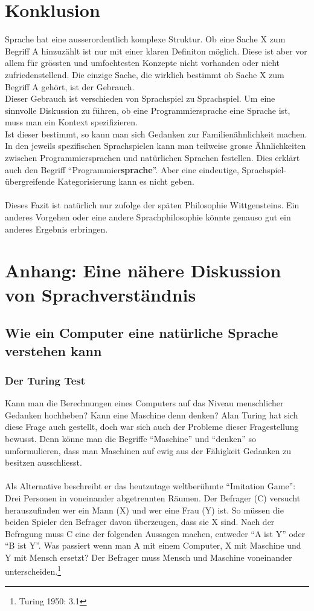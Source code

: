 \documentclass[10pt,a4paper]{article}
\begin{document}
\section{Konklusion}
Sprache hat eine ausserordentlich komplexe Struktur. Ob eine Sache X zum Begriff A hinzuzählt ist nur mit einer klaren Definiton möglich. Diese ist aber vor allem für grössten und umfochtesten Konzepte nicht vorhanden oder nicht zufriedenstellend.
Die einzige Sache, die wirklich bestimmt ob Sache X zum Begriff A gehört, ist der Gebrauch. \\
Dieser Gebrauch ist verschieden von Sprachspiel zu Sprachspiel.
Um eine sinnvolle Diskussion zu führen, ob eine Programmiersprache eine Sprache ist, muss man ein Kontext spezifizieren. \\
Ist dieser bestimmt, so kann man sich Gedanken zur Familienähnlichkeit machen.
In den jeweils spezifischen Sprachspielen kann man teilweise grosse Ähnlichkeiten zwischen Programmiersprachen und natürlichen Sprachen festellen. Dies erklärt auch den Begriff \enquote{Programmier\textbf{sprache}}. Aber eine eindeutige, Sprachspiel-übergreifende Kategorisierung kann es nicht geben. \\
\\
Dieses Fazit ist natürlich nur zufolge der späten Philosophie Wittgensteins. Ein anderes Vorgehen oder eine andere Sprachphilosophie könnte genauso gut ein anderes Ergebnis erbringen.



\section{Anhang: Eine nähere Diskussion von Sprachverständnis}

\subsection{Wie ein Computer eine natürliche Sprache verstehen kann}
\subsubsection{Der Turing Test}
Kann man die Berechnungen eines Computers auf das Niveau menschlicher Gedanken hochheben? Kann eine Maschine denn denken? Alan Turing hat sich diese Frage auch gestellt, doch war sich auch der Probleme dieser Fragestellung bewusst. Denn könne man die Begriffe \enquote{Maschine} und \enquote{denken} so umformulieren, dass man Maschinen auf ewig aus der Fähigkeit Gedanken zu besitzen ausschliesst.\\
\\
Als Alternative beschreibt er das heutzutage weltberühmte \enquote{Imitation Game}:
Drei Personen in voneinander abgetrennten Räumen. Der Befrager (C) versucht herauszufinden wer ein Mann (X) und wer eine Frau (Y) ist. So müssen die beiden Spieler den Befrager davon überzeugen, dass sie X sind. Nach der Befragung muss C eine der folgenden Aussagen machen, entweder \enquote{A ist Y} oder \enquote{B ist Y}. Was passiert wenn man A mit einem Computer, X mit Maschine und Y mit Mensch ersetzt? Der Befrager muss Mensch und Maschine voneinander unterscheiden.\footnote{Turing 1950: 3.1} \\
\end{document}

